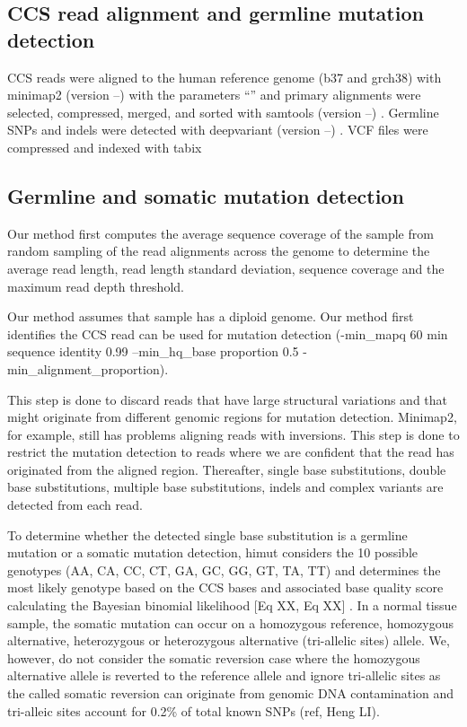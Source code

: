 \subsection{CCS read alignment and germline mutation detection}
CCS reads were aligned to the human reference genome (b37 and grch38) with minimap2 (version --) with the parameters “” \cite{Li2018-am} and primary alignments were selected, compressed, merged, and sorted with samtools (version --) \cite{Li2009-qp}. Germline SNPs and indels were detected with deepvariant (version --) \cite{Poplin2018-ub}. VCF files were compressed and indexed with tabix \cite{Li2011-zj} 

\subsection{Germline and somatic mutation detection}

Our method first computes the average sequence coverage of the sample from random sampling of the read alignments across the genome to determine the average read length, read length standard deviation, sequence coverage and the maximum read depth threshold. 

Our method assumes that sample has a diploid genome. Our method first identifies the CCS read can be used for mutation detection (-min\_mapq 60 min sequence identity 0.99 --min\_hq\_base proportion 0.5 -min\_alignment\_proportion). 

This step is done to discard reads that have large structural variations and that might originate from different genomic regions for mutation detection. Minimap2, for example, still has problems aligning reads with inversions. This step is done to restrict the mutation detection to reads where we are confident that the read has originated from the aligned region. Thereafter, single base substitutions, double base substitutions, multiple base substitutions, indels and complex variants are detected from each read. 

To determine whether the detected single base substitution is a germline mutation or a somatic mutation detection, himut considers the 10 possible genotypes (AA, CA, CC, CT, GA, GC, GG, GT, TA, TT) and determines the most likely genotype based on the CCS bases and associated base quality score calculating the Bayesian binomial likelihood [Eq XX, Eq XX] \cite{Li2011-ag}.  In a normal tissue sample, the somatic mutation can occur on a homozygous reference, homozygous alternative, heterozygous or heterozygous alternative (tri-allelic sites) allele. We, however, do not consider the somatic reversion case where the homozygous alternative allele is reverted to the reference allele and ignore tri-allelic sites as the called somatic reversion can originate from genomic DNA contamination and tri-alleic sites account for 0.2\% of total known SNPs (ref, Heng LI). 

